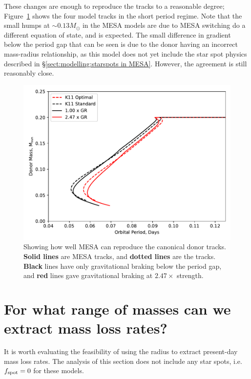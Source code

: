These changes are enough to reproduce the \citet{knigge11} tracks to a reasonable degree; Figure~\ref{fig:results:MESA can reproduce the K11 tracks} shows the four model tracks in the short period regime. Note that the small humps at $\sim 0.13 M_\odot$ in the MESA models are due to MESA switching do a different equation of state, and is expected.
The small difference in gradient below the period gap that can be seen is due to the donor having an incorrect mass-radius relationship, as this model does not yet include the star spot physics described in \S\ref{sect:modelling:starspots in MESA}. However, the agreement is still reasonably close.

\begin{figure}
    \centering
    \includegraphics[width=.9\textwidth]{figures/modelling/reproducing_K11_tracks_fspot0.000.pdf}
    \caption{Showing how well MESA can reproduce the canonical \citet{knigge11} donor tracks. {\bf Solid lines} are MESA tracks, and {\bf dotted lines} are the \citet{knigge11} tracks. {\bf Black} lines have only gravitational braking below the period gap, and {\bf red} lines gave gravitational braking at $2.47\times$ strength.}
    \label{fig:results:MESA can reproduce the K11 tracks}
\end{figure}



\section{For what range of masses can we extract mass loss rates?}
\label{sect:results:MESA massloss allowable mass range}

It is worth evaluating the feasibility of using the radius to extract present-day mass loss rates. The analysis of this section does not include any star spots, i.e. $f_{\rm spot} = 0$ for these models.

